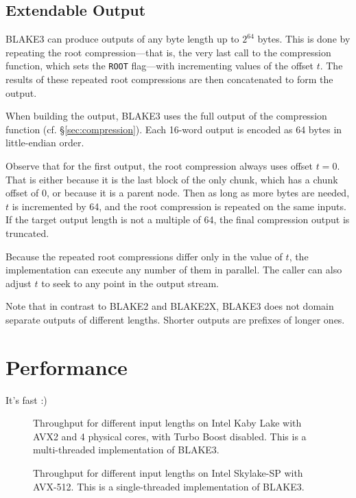 \documentclass[11pt,notitlepage,a4paper]{article}
\begin{document}
\subsection{Extendable Output}\label{sec:extendable}

BLAKE3 can produce outputs of any byte length up to $2^{64}$ bytes. 
This is done by repeating the root compression---that is, the very last 
call to the compression function, which sets the \texttt{ROOT} flag---with 
incrementing values of the offset $t$. The results of these repeated root 
compressions are then concatenated to form the output.

When building the output, BLAKE3 uses the full output of the
compression function (cf. \S\ref{sec:compression}). Each 16-word output is
encoded as 64 bytes in little-endian order.

Observe that for the first output, the root compression always uses offset $t
= 0$. That is either because it is the last block of the only chunk, which has
a chunk offset of $0$, or because it is a parent node. Then as long as more 
bytes are needed, $t$ is incremented by 64, and the root compression is 
repeated on the same inputs. If the target output length is not a multiple of 64, 
the final compression output is truncated.

Because the repeated root compressions differ only in the value of $t$, the
implementation can execute any number of them in parallel. The caller can also
adjust $t$ to seek to any point in the output stream.

Note that in contrast to BLAKE2 and BLAKE2X, BLAKE3 does not domain separate
outputs of different lengths. Shorter outputs are prefixes of longer ones.

\section{Performance}\label{sec:performance}

It's fast :)

\begin{figure}[h]

\caption{Throughput for different input lengths on Intel Kaby Lake with AVX2
    and 4 physical cores, with Turbo Boost disabled. This is a multi-threaded
    implementation of BLAKE3.}
\label{fig:avx2_rayon}
\end{figure}

\begin{figure}[h]

\caption{Throughput for different input lengths on Intel Skylake-SP with
    AVX-512. This is a single-threaded implementation of BLAKE3.}
\label{fig:avx512_c}
\end{figure}
\end{document}
